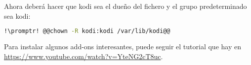 \noindent Ahora deberá hacer que kodi sea el dueño del fichero y el grupo predeterminado sea kodi:

\begin{lstlisting}[gobble=2,language=bash,style=bashinteract,escapechar=!]
  !\promptr! @@chown -R kodi:kodi /var/lib/kodi@@
\end{lstlisting}

Para instalar algunos add-ons interesantes, puede seguir el tutorial que hay en
\url{https://www.youtube.com/watch?v=YteNG2cT8uc}.
